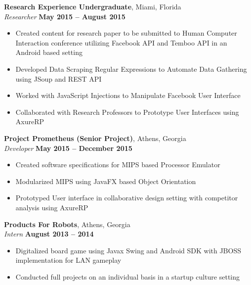 \documentclass[margin,line]{resume}
\begin{document}
\begin{resume}
\begin{list2}
	
	\textbf{Research Experience Undergraduate}, Miami, Florida \vspace{1mm}\\\vspace{1mm}%
	\textsl{Researcher} \hfill \textbf{May 2015 -- August 2015}
	\begin{itemize}
		\item Created content for research paper to be submitted to Human Computer Interaction conference utilizing Facebook API and Temboo API in an Android based setting
		\item Developed Data Scraping Regular Expressions to Automate Data Gathering using JSoup and REST API
		\item Worked with JavaScript Injections to Manipulate Facebook User Interface
		\item Collaborated with  Research Professors to Prototype User Interfaces using AxureRP
	\end{itemize}
	
	\textbf{Project Prometheus (Senior Project)}, Athens, Georgia \vspace{1mm}\\\vspace{1mm}%
	\textsl{Developer} \hfill \textbf{May 2015 -- December 2015}
		\begin{itemize}
		\item Created software specifications for MIPS based Processor Emulator
		\item Modularized MIPS using JavaFX based Object Orientation
		\item Prototyped User interface in collaborative design setting with competitor analysis using AxureRP 
	\end{itemize}

	
	\textbf{Products For Robots}, Athens, Georgia \vspace{1mm}\\\vspace{1mm}%
	\textsl{Intern} \hfill \textbf{August 2013 -- 2014}
	\begin{itemize}
		\item Digitalized board game using Javax Swing and Android SDK with JBOSS implementation for LAN gameplay
		\item Conducted full projects on an individual basis in a startup culture setting
	\end{itemize}
	
	
	\end{list2}\vspace{-1.5mm}

\end{resume}
\end{document}
